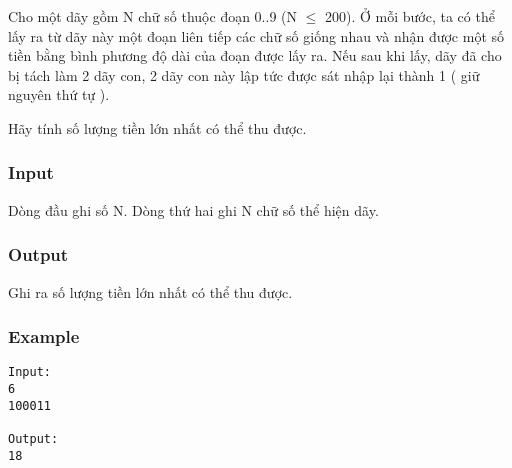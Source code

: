 



   Cho một dãy gồm N chữ số thuộc đoạn 0..9 (N $\le$ 200). Ở mỗi bước, ta có thể lấy ra từ dãy này một đoạn liên tiếp các chữ số giống nhau và nhận được một số tiền bằng bình phương độ dài của đoạn được lấy ra. Nếu sau khi lấy, dãy đã cho bị tách làm 2 dãy con, 2 dãy con này lập tức được sát nhập lại thành 1 ( giữ nguyên thứ tự ).   


   Hãy tính số lượng tiền lớn nhất có thể thu được.  

\subsubsection{   Input  }

   Dòng đầu ghi số N. Dòng thứ hai ghi N chữ số thể hiện dãy.  

\subsubsection{   Output  }

   Ghi ra số lượng tiền lớn nhất có thể thu được.  

\subsubsection{   Example  }
\begin{verbatim}
Input:
6
100011

Output:
18
\end{verbatim}
